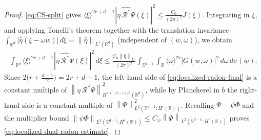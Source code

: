 \documentclass[10pt,a4paper]{amsart}
\newcommand{\R}{\mathbb{R}}
\newcommand{\Sph}{\mathbb S}
\newcommand{\norm}[1]{\left\|#1\right\|}
\begin{document}
\begin{proof}
\eqref{eq:CS-split} gives
$\langle\xi\rangle^{2r+d-1}|\widehat{\eta\,\mathcal R^*\Psi}(\xi)|^2
\le\tfrac{C_0}{(2\pi)^2}J(\xi)$. Integrating in $\xi$, and applying Tonelli's
theorem together with the translation invariance
$\int_{\R^d}|\widehat\eta(\xi-\omega w)|\,d\xi=\norm{\widehat\eta}_{L^1(\R^d)}$
(independent of $(w,\omega)$), we obtain
\begin{align}
    \int_{\R^d}\langle\xi\rangle^{2r+d-1}
    |\widehat{\eta\,\mathcal R^*\Psi}(\xi)|^2\,d\xi
    \le\frac{C_0\norm{\widehat\eta}_{L^1}}{(2\pi)^2}
    \int_{\Sph^{d-1}}\int_\R
    \langle\omega\rangle^{2r}|G(w,\omega)|^2\,d\omega\,d\sigma(w).
    \label{eq:localized-radon-final}
\end{align}
Since $2\bigl(r+\tfrac{d-1}2\bigr)=2r+d-1$, the left-hand side of
\eqref{eq:localized-radon-final} is a constant multiple of
$\norm{\eta\,\mathcal R^*\Psi}_{H^{r+(d-1)/2}(\R^d)}^2$, while by Plancherel in $b$
the right-hand side is a constant multiple of
$\norm{\Psi}_{L^2(\Sph^{d-1};H^r(\R))}^2$. Recalling $\Psi=\psi\Phi$ and the
multiplier bound $\norm{\psi\Phi}_{L^2(\Sph^{d-1};H^r(\R))}\le
C_\psi\norm{\Phi}_{L^2(\Sph^{d-1};H^r(\R))}$ proves
\eqref{eq:localized-dual-radon-estimate}.
\end{proof}
\end{document}
